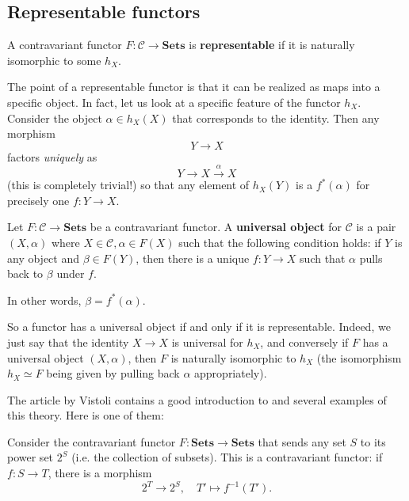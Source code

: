 \begin{proposition}
\begin{theorem}
\end{theorem}

\subsection{Representable functors}

\begin{definition}
A contravariant functor $F: \mathcal{C} \to \mathbf{Sets}$ is
\textbf{representable} if it is naturally isomorphic to some $h_X$.
\end{definition}

The point of a representable functor is that it can be realized as maps into a
specific object.
In fact, let us look at a specific feature of the functor $h_X$.
Consider the object $\alpha \in h_X(X)$ that corresponds to the identity.
Then any morphism
\[ Y \to X  \]
factors \emph{uniquely}
as \[ Y \to X \stackrel{\alpha}{\to } X  \]
(this is completely trivial!) so that
any element of $h_X(Y)$ is a $f^*(\alpha)$ for precisely one $f:  Y \to X$.

\begin{definition}
Let $F: \mathcal{C} \to \mathbf{Sets}$ be a contravariant functor. A
\textbf{universal object} for $\mathcal{C}$ is a pair $(X, \alpha)$ where $X
\in \mathcal{C}, \alpha \in F(X)$ such that the following condition holds:
if $Y$ is any object and $\beta \in F(Y)$, then there is a unique $f: Y \to X$
such that $\alpha$ pulls back to $\beta$ under $f$.

In other words, $\beta = f^*(\alpha)$.
\end{definition}

So a functor has a universal object if and only if it is representable.
Indeed, we just say that the identity $X \to X$ is universal for $h_X$, and
conversely if $F$ has a universal object $(X, \alpha)$, then $F$ is naturally
isomorphic to $h_X$ (the isomorphism $h_X \simeq F$ being given by pulling
back $\alpha$ appropriately).


The article \cite{Vi08} by Vistoli contains a good introduction to and several
examples of this theory.
Here is one of them:

\begin{example}
Consider the contravariant functor $F: \mathbf{Sets} \to \mathbf{Sets}$ that
sends any set $S$ to its power set $2^S$ (i.e. the collection of subsets).
This is a contravariant functor: if $f: S \to T$, there is a morphism
\[ 2^T \to 2^S, \quad T' \mapsto f^{-1}(T').  \]


\end{example}
\end{proposition}
